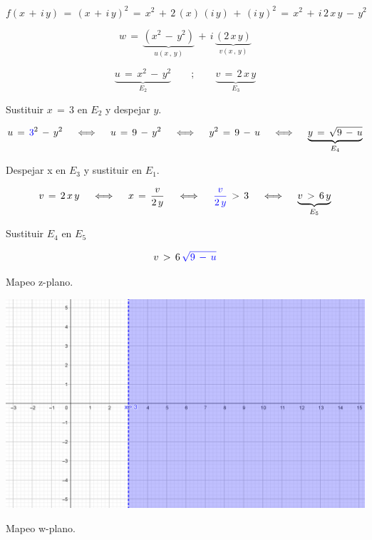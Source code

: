\documentclass[a4paper,11pt,openany]{book}
\begin{document}
$$f(x\,+\,i\,y)\,=\,(x\,+\,i\,y)^{2}\,=\,x^{2}\,+\,2\,(x)\,(i\,y)\,+\,(i\,y)^{2}\,=\,x^{2}\,+\,i\,2\,x\,y\,-\,y^{2}$$

$$w\,=\,\underbrace{(x^{2}\,-\,y^{2})}_{u(x\,,\,y)}\,+\,i\,\underbrace{(2\,x\,y)}_{v(x\,,\,y)}$$

$$\underbrace{u\,=\,x^{2}\,-\,y^{2}}_{E_{2}} \qquad;\qquad \underbrace{v\,=\,2\,x\,y}_{E_{3}}$$

\textcolor{ao(english)}{} Sustituir $x\,=\,3$ en $E_{2}$ y despejar $y$.

$$u\,=\,\textcolor{ao}{3}^{2}\,-\,y^{2} \quad\iff\quad u\,=\,9\,-\,y^{2} \quad\iff\quad y^{2}\,=\,9\,-\,u \quad\iff\quad \underbrace{y\,=\,\sqrt{9\,-\,u}}_{E_{4}}$$

\textcolor{ao(english)}{} Despejar x en $E_{3}$ y sustituir en $E_{1}$.

$$v\,=\,2\,x\,y \quad\iff\quad x\,=\,\dfrac{v}{2\,y} \quad\iff\quad \textcolor{ao}{\dfrac{v}{2\,y}}\,>\,3 \quad\iff\quad \underbrace{v\,>\,6\,y}_{E_{5}}$$

\textcolor{ao(english)}{} Sustituir $E_{4}$ en $E_{5}$

$$v\,>\,6\,\textcolor{ao}{\sqrt{9\,-\,u}}$$

\newpage

\textcolor{ao(english)}{} Mapeo z-plano.

\begin{center}
     \includegraphics[width=15cm]{Mapeo-Ej-5-z.png}
\end{center}

\textcolor{ao(english)}{} Mapeo w-plano.
\end{document}
